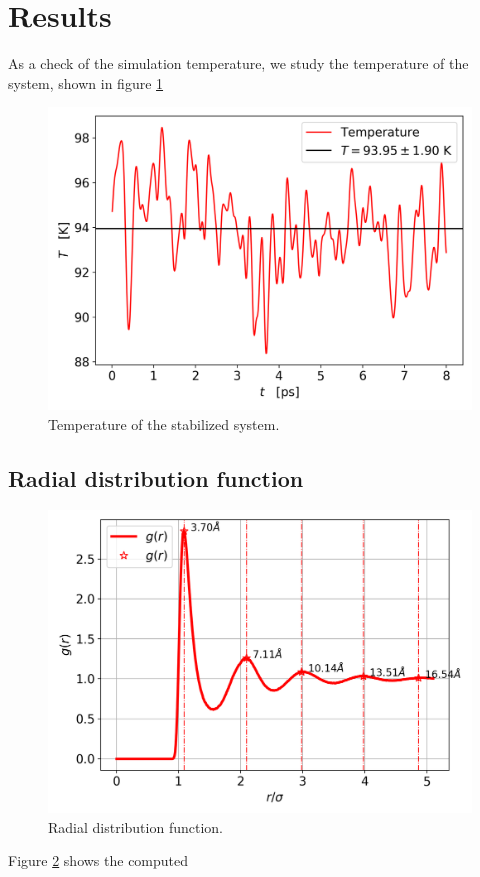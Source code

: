 \documentclass[%
aip,
jmp,%
amsmath,amssymb,
preprint,%
reprint,%
notitlepage,
a4paper]{revtex4-1}
\begin{document}
\section{Results}
As a check of the simulation temperature, we study the temperature of the system, shown in figure \ref{fig:Tvst} 
\begin{figure}[t]
	\centering
	\includegraphics[width=0.9\linewidth]{../task2/results/Tvst}
	\caption{Temperature of the stabilized system.}
	\label{fig:Tvst}
\end{figure}
\subsection{Radial distribution function}
\begin{figure}[t]
	\centering
	\includegraphics[width=0.9\linewidth]{../task2/results/gofr}
	\caption{Radial distribution function.}
	\label{fig:gofr}
\end{figure}
Figure \ref{fig:gofr} shows the computed 
\end{document}
